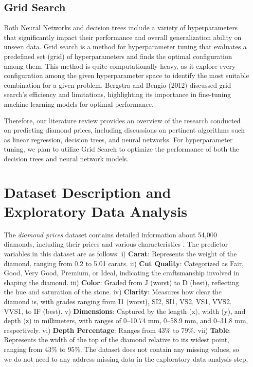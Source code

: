 \documentclass[conference]{IEEEtran}
\begin{document}
\subsection{Grid Search}

Both Neural Networks and decision trees include a variety of hyperparameters that significantly impact their performance and overall generalization ability on unseen data. Grid search is a method for hyperparameter tuning that evaluates a predefined set (grid) of hyperparameters and finds the optimal configuration among them. This method is quite computationally heavy, as it explore every configuration among the given hyperparameter space to identify the most suitable combination for a given problem. Bergstra and Bengio (2012) \cite{Bergstra} discussed grid search's efficiency and limitations, highlighting its importance in fine-tuning machine learning models for optimal performance.

Therefore, our literature review provides an overview of the research conducted on predicting diamond prices, including discussions on pertinent algorithms such as linear regression, decision trees, and neural networks. For hyperparameter tuning, we plan to utilize Grid Search to optimize the performance of both the decision trees and neural network models.

\section{Dataset Description and Exploratory Data Analysis}

The \emph{diamond prices} dataset contains detailed information about 54,000 diamonds, including their prices and various characteristics \cite{kaggle}. The predictor variables in this dataset are as follows: i) \textbf{Carat}: Represents the weight of the diamond, ranging from 0.2 to 5.01 carats. ii) \textbf{Cut Quality}: Categorized as Fair, Good, Very Good, Premium, or Ideal, indicating the craftsmanship involved in shaping the diamond. iii) \textbf{Color}: Graded from J (worst) to D (best), reflecting the hue and saturation of the stone. iv) \textbf{Clarity}: Measures how clear the diamond is, with grades ranging from I1 (worst), SI2, SI1, VS2, VS1, VVS2, VVS1, to IF (best). v) \textbf{Dimensions}: Captured by the length (x), width (y), and depth (z) in millimeters, with ranges of 0–10.74 mm, 0–58.9 mm, and 0–31.8 mm, respectively. vi) \textbf{Depth Percentage}: Ranges from 43\% to 79\%. vii) \textbf{Table}: Represents the width of the top of the diamond relative to its widest point, ranging from 43\% to 95\%. The dataset does not contain any missing values, so we do not need to any address missing data in the exploratory data analysis step.
\end{document}
